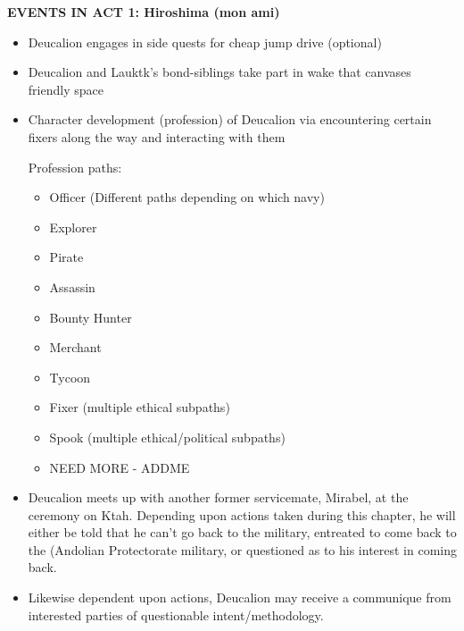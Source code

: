 {\bf EVENTS IN ACT 1: Hiroshima (mon ami)}
\begin{itemize}
\item Deucalion engages in side quests for cheap jump drive (optional)
\item Deucalion and Lauktk's bond-siblings take part in wake that canvases friendly space
\item Character development (profession) of Deucalion via encountering certain fixers along the way and interacting with them

 Profession paths:
\begin{itemize}
\item		Officer (Different paths depending on which navy)
\item		Explorer
\item		Pirate
\item		Assassin
\item		Bounty Hunter
\item		Merchant
\item		Tycoon
\item		Fixer (multiple ethical subpaths)
\item		Spook (multiple ethical/political subpaths)
\item		{NEED MORE - ADDME}
\end{itemize}
\item Deucalion meets up with another former servicemate, Mirabel, at
the ceremony on Ktah.  Depending upon actions taken during this
chapter, he will either be told that he can't go back to the military,
entreated to come back to the (Andolian Protectorate military, or
questioned as to his interest in coming back.
\item Likewise dependent upon actions, Deucalion may receive a
communique from interested parties of questionable intent/methodology.
\end{itemize}

